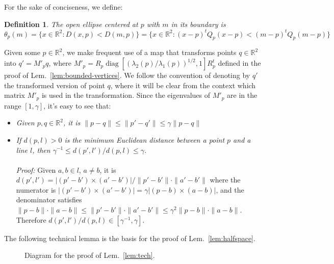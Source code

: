 \documentclass[11pt]{article}
\newtheorem{definition}[theorem]{Definition}
\newcommand{\diag}{\mathop{\mathrm{diag}}}
\begin{document}
For the sake of conciseness, we define: \begin{definition}
	The open ellipse centered at $p$ with $m$ in its boundary is \[\theta_p(m) = \{x\in\mathbb{R}^2 : D(x,p) < D(m,p)\} =
\{x\in\mathbb{R}^2 : (x-p)^t Q_p (x-p) < (m-p)^t Q_p (m-p)\}\]
\end{definition}




Given some $p\in\mathbb{R}^2$, we make frequent use of a map that transforms points
$q\in\mathbb{R}^2$ into $q'=M'_p q$, where 
$M'_p=R_p \diag[(\lambda_2(p)/\lambda_1(p))^{1/2}, 1]R_p^t$ defined in the
proof of Lem.~\ref{lem:bounded-vertices}. We follow the convention of denoting by $q'$ the transformed version of point
$q$, where it will be clear from the context which matrix $M'_p$ is used in
the transformation. 
Since the eigenvalues of $M'_p$ are in the range $[1,\gamma]$, it's easy to
see that: \begin{itemize}
\item \emph{Given $p,q\in\mathbb{R}^2$, it is $\|p-q\| \le \|p'-q'\| \le \gamma \|p-q\|$}
\item \emph{If $d(p,l)>0$ is the minimum Euclidean distance between a point
$p$ and a line $l$, then $\gamma^{-1} \le d(p',l')/d(p,l) \le \gamma$.}\\ \\
\emph{Proof:} Given $a,b\in l$, $a\neq b$, it is $d(p',l') = |(p'-b')\times (a'-b')| /
\|p'-b'\|\cdot\|a'-b'\|$ where the numerator is $|(p'-b')\times (a'-b')| =
\gamma |(p-b)\times (a-b)|$, and the denominator satisfies 
$\|p-b\|\cdot\|a-b\| \le \|p'-b'\|\cdot\|a'-b'\| \le \gamma^2
\|p-b\|\cdot\|a-b\|$. Therefore $d(p',l')/d(p,l) \in [\gamma^{-1},\gamma]$. 
\end{itemize}
The following technical lemma is 
the basis for the proof of Lem.~\ref{lem:halfspace}. 




\begin{figure}[ht]
\centering
{}
\label{fig:theta}
\caption{Diagram for the proof of Lem.~\ref{lem:tech}.}
\end{figure}
\end{document}
